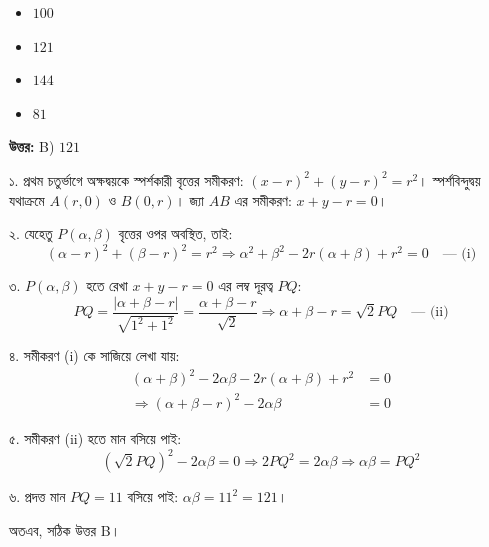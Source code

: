 \documentclass[12pt, a4paper]{article}
\begin{document}
\begin{itemize}[label={}, leftmargin=1cm, itemsep=0.5em]
    \item[\textbf{A)}] $100$
    \item[\textbf{B)}] $121$
    \item[\textbf{C)}] $144$
    \item[\textbf{D)}] $81$
\end{itemize}

\vspace{0.5em}
\begin{tcolorbox}[answerbox]
    \textbf{\color{success} উত্তর:} B) $121$
\end{tcolorbox}
\vspace{1em}

\begin{tcolorbox}[solutionbox={সমাধান (Solution)}]
    \noindent
    ১. প্রথম চতুর্ভাগে অক্ষদ্বয়কে স্পর্শকারী বৃত্তের সমীকরণ: $(x - r)^2 + (y - r)^2 = r^2$। স্পর্শবিন্দুদ্বয় যথাক্রমে $A(r, 0)$ ও $B(0, r)$। জ্যা $AB$ এর সমীকরণ: $x + y - r = 0$।
    
    \vspace{0.5em}
    ২. যেহেতু $P(\alpha, \beta)$ বৃত্তের ওপর অবস্থিত, তাই:
    \[ (\alpha - r)^2 + (\beta - r)^2 = r^2 \Rightarrow \alpha^2 + \beta^2 - 2r(\alpha + \beta) + r^2 = 0 \quad \text{--- (i)} \]
    
    \vspace{0.5em}
    ৩. $P(\alpha, \beta)$ হতে রেখা $x + y - r = 0$ এর লম্ব দূরত্ব $PQ$:
    \[ PQ = \frac{|\alpha + \beta - r|}{\sqrt{1^2 + 1^2}} = \frac{\alpha + \beta - r}{\sqrt{2}} \Rightarrow \alpha + \beta - r = \sqrt{2}PQ \quad \text{--- (ii)} \]
    
    \vspace{0.5em}
    ৪. সমীকরণ (i) কে সাজিয়ে লেখা যায়:
    \begin{align*}
        (\alpha + \beta)^2 - 2\alpha\beta - 2r(\alpha + \beta) + r^2 &= 0 \\
        \Rightarrow (\alpha + \beta - r)^2 - 2\alpha\beta &= 0
    \end{align*}
    
    \vspace{0.5em}
    ৫. সমীকরণ (ii) হতে মান বসিয়ে পাই:
    \[ (\sqrt{2}PQ)^2 - 2\alpha\beta = 0 \Rightarrow 2PQ^2 = 2\alpha\beta \Rightarrow \alpha\beta = PQ^2 \]
    
    \vspace{0.5em}
    ৬. প্রদত্ত মান $PQ = 11$ বসিয়ে পাই: $\alpha\beta = 11^2 = 121$। 
    
    \vspace{0.5em}
    অতএব, সঠিক উত্তর B।
\end{tcolorbox}

\vspace{2em}
\end{document}
